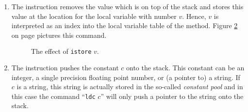 \begin{enumerate}
\begin{figure}[!ht]
{\begin{picture}
\end{picture}}
  \caption{The effect of \texttt{iload} $v$.}
  \label{fig:ijvm-load}
\end{figure}
\item The instruction 
      removes the value which is on top of the stack and stores this value at the location for the local
      variable with number $v$.  Hence, $v$ is interpreted as an index into the local variable table of
      the method.
      Figure \ref{fig:ijvm-store} on page \pageref{fig:ijvm-store} pictures this command.

\setlength{\unitlength}{0.5cm}
\begin{figure}[!ht]
  \centering
{}
  \caption{The effect of \texttt{istore} $v$.}
  \label{fig:ijvm-store}
\end{figure}

\item The instruction 
      pushes the constant $c$ onto the stack.  This constant can be an integer, a single precision floating
      point number, or (a pointer to) a string.  If $c$ is a string, this string is actually stored in the
      so-called \emph{constant pool} and in this case the command ``\texttt{ldc} $c$'' will only push a
      pointer to the string onto the stack.
\end{enumerate}
      
